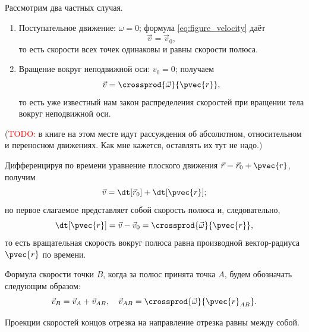 Рассмотрим два частных случая.
\begin{enumerate}
  \item Поступательное движение: $\omega = 0$; формула \ref{eq:figure_velocity}
    даёт
    \begin{equation*}
      \vec{v} = \vec{v}_0,
    \end{equation*}
    то есть скорости всех точек одинаковы и равны скорости полюса.

  \item Вращение вокруг неподвижной оси: $v_0 = 0$; получаем
    \begin{equation*}
      \vec{v} = \crossprod{\vec{\omega}}{\pvec{r}},
    \end{equation*}
    то есть уже известный нам закон распределения скоростей при вращении тела
    вокруг неподвижной оси.
\end{enumerate}

(\textcolor{red}{TODO:} в книге на этом месте идут рассуждения об абсолютном,
относительном и переносном движениях. Как мне кажется, оставлять их тут не
надо.)

Дифференцируя по времени уравнение плоского движения $\vec{r} = \vec{r}_0 +
\pvec{r}$, получим
\begin{equation*}
  \vec{v} = \dt[\vec{r}_0] + \dt[\pvec{r}];
\end{equation*}
но первое слагаемое представляет собой скорость полюса и, следовательно,
\begin{equation}
  \label{eq:rotational_velocity}
  \dt[\pvec{r}] = \vec{v} - \vec{v}_0 = \crossprod{\vec{\omega}}{\pvec{r}},
\end{equation}
то есть вращательная скорость вокруг полюса равна производной вектор-радиуса
$\pvec{r}$ по времени.

Формула скорости точки $B$, когда за полюс принята точка $A$, будем обозначать
следующим образом:
\begin{equation}
  \label{eq:figure_velocity_named}
  \vec{v}_B = \vec{v}_A + \vec{v}_{AB}, \quad \vec{v}_{AB} =
    \crossprod{\vec{\omega}}{\pvec{r}_{AB}}.
\end{equation}

\begin{theorem}
  Проекции скоростей концов отрезка на направление отрезка равны между собой.
\end{theorem}

